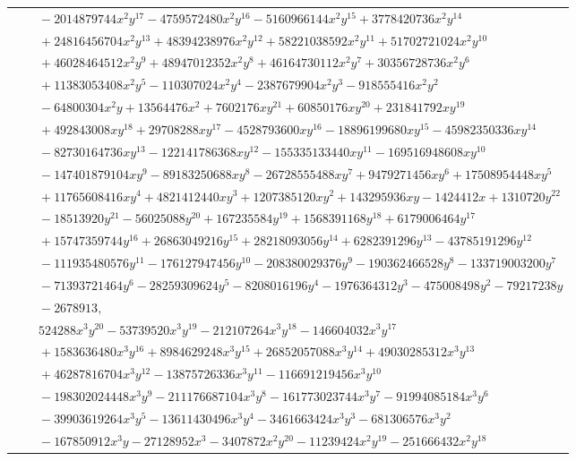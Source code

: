 \documentclass[11pt]{article}
\begin{document}
\begin{longtable}{@{}ll@{}}
 & $\quad -2014879744x^{2}y^{17}-4759572480x^{2}y^{16}-5160966144x^{2}y^{15}+3778420736x^{2}y^{14}$\\
 & $\quad +24816456704x^{2}y^{13}+48394238976x^{2}y^{12}+58221038592x^{2}y^{11}+51702721024x^{2}y^{10}$\\
 & $\quad +46028464512x^{2}y^{9}+48947012352x^{2}y^{8}+46164730112x^{2}y^{7}+30356728736x^{2}y^{6}$\\
 & $\quad +11383053408x^{2}y^{5}-110307024x^{2}y^{4}-2387679904x^{2}y^{3}-918555416x^{2}y^{2}$\\
 & $\quad -64800304x^{2}y+13564476x^{2}+7602176xy^{21}+60850176xy^{20}+231841792xy^{19}$\\
 & $\quad +492843008xy^{18}+29708288xy^{17}-4528793600xy^{16}-18896199680xy^{15}-45982350336xy^{14}$\\
 & $\quad -82730164736xy^{13}-122141786368xy^{12}-155335133440xy^{11}-169516948608xy^{10}$\\
 & $\quad -147401879104xy^{9}-89183250688xy^{8}-26728555488xy^{7}+9479271456xy^{6}+17508954448xy^{5}$\\
 & $\quad +11765608416xy^{4}+4821412440xy^{3}+1207385120xy^{2}+143295936xy-1424412x+1310720y^{22}$\\
 & $\quad -18513920y^{21}-56025088y^{20}+167235584y^{19}+1568391168y^{18}+6179006464y^{17}$\\
 & $\quad +15747359744y^{16}+26863049216y^{15}+28218093056y^{14}+6282391296y^{13}-43785191296y^{12}$\\
 & $\quad -111935480576y^{11}-176127947456y^{10}-208380029376y^{9}-190362466528y^{8}-133719003200y^{7}$\\
 & $\quad -71393721464y^{6}-28259309624y^{5}-8208016196y^{4}-1976364312y^{3}-475008498y^{2}-79217238y$\\
 & $\quad -2678913,$\\
 & $\quad 524288x^{3}y^{20}-53739520x^{3}y^{19}-212107264x^{3}y^{18}-146604032x^{3}y^{17}$\\
 & $\quad +1583636480x^{3}y^{16}+8984629248x^{3}y^{15}+26852057088x^{3}y^{14}+49030285312x^{3}y^{13}$\\
 & $\quad +46287816704x^{3}y^{12}-13875726336x^{3}y^{11}-116691219456x^{3}y^{10}$\\
 & $\quad -198302024448x^{3}y^{9}-211176687104x^{3}y^{8}-161773023744x^{3}y^{7}-91994085184x^{3}y^{6}$\\
 & $\quad -39903619264x^{3}y^{5}-13611430496x^{3}y^{4}-3461663424x^{3}y^{3}-681306576x^{3}y^{2}$\\
 & $\quad -167850912x^{3}y-27128952x^{3}-3407872x^{2}y^{20}-11239424x^{2}y^{19}-251666432x^{2}y^{18}$\\

\end{longtable}
\end{document}
